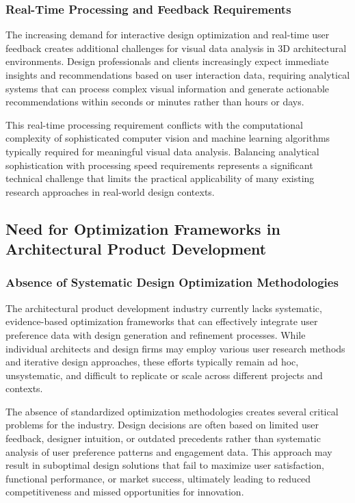 \documentclass[12pt,a4paper]{book}
\begin{document}
\subsubsection{Real-Time Processing and Feedback Requirements}
\label{subsubsec:realtime_processing}

The increasing demand for interactive design optimization and real-time user feedback creates additional challenges for visual data analysis in 3D architectural environments. Design professionals and clients increasingly expect immediate insights and recommendations based on user interaction data, requiring analytical systems that can process complex visual information and generate actionable recommendations within seconds or minutes rather than hours or days.

This real-time processing requirement conflicts with the computational complexity of sophisticated computer vision and machine learning algorithms typically required for meaningful visual data analysis. Balancing analytical sophistication with processing speed requirements represents a significant technical challenge that limits the practical applicability of many existing research approaches in real-world design contexts.

\subsection{Need for Optimization Frameworks in Architectural Product Development}
\label{subsec:optimization_frameworks_need}

\subsubsection{Absence of Systematic Design Optimization Methodologies}
\label{subsubsec:systematic_methodologies_absence}

The architectural product development industry currently lacks systematic, evidence-based optimization frameworks that can effectively integrate user preference data with design generation and refinement processes. While individual architects and design firms may employ various user research methods and iterative design approaches, these efforts typically remain ad hoc, unsystematic, and difficult to replicate or scale across different projects and contexts.

The absence of standardized optimization methodologies creates several critical problems for the industry. Design decisions are often based on limited user feedback, designer intuition, or outdated precedents rather than systematic analysis of user preference patterns and engagement data. This approach may result in suboptimal design solutions that fail to maximize user satisfaction, functional performance, or market success, ultimately leading to reduced competitiveness and missed opportunities for innovation.
\end{document}
